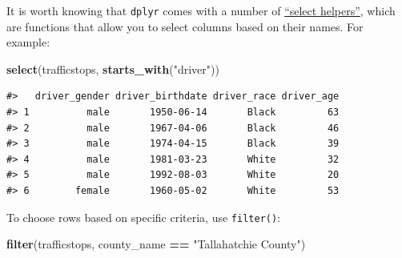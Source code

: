 \documentclass[]{book}
\newenvironment{Shaded}{\begin{snugshade}}{\end{snugshade}}
\newcommand{\KeywordTok}[1]{\textcolor[rgb]{0.13,0.29,0.53}{\textbf{#1}}}
\newcommand{\StringTok}[1]{\textcolor[rgb]{0.31,0.60,0.02}{#1}}
\newcommand{\OperatorTok}[1]{\textcolor[rgb]{0.81,0.36,0.00}{\textbf{#1}}}
\newcommand{\NormalTok}[1]{#1}
\theoremstyle{definition}
\theoremstyle{definition}
\theoremstyle{definition}
\theoremstyle{remark}
\begin{document}
It is worth knowing that \texttt{dplyr} comes with a number of
\href{https://www.rdocumentation.org/packages/dplyr/versions/0.7.2/topics/select_helpers}{``select
helpers''}, which are functions that allow you to select columns based
on their names. For example:

\begin{Shaded}
\begin{Highlighting}[]
\KeywordTok{select}\NormalTok{(trafficstops, }\KeywordTok{starts_with}\NormalTok{(}\StringTok{"driver"}\NormalTok{))}
\end{Highlighting}
\end{Shaded}

\begin{verbatim}
#>   driver_gender driver_birthdate driver_race driver_age
#> 1          male       1950-06-14       Black         63
#> 2          male       1967-04-06       Black         46
#> 3          male       1974-04-15       Black         39
#> 4          male       1981-03-23       White         32
#> 5          male       1992-08-03       White         20
#> 6        female       1960-05-02       White         53
\end{verbatim}

To choose rows based on specific criteria, use \texttt{filter()}:

\begin{Shaded}
\begin{Highlighting}[]
\KeywordTok{filter}\NormalTok{(trafficstops, county_name }\OperatorTok{==}\StringTok{ "Tallahatchie County"}\NormalTok{)}
\end{Highlighting}
\end{Shaded}
\end{document}

